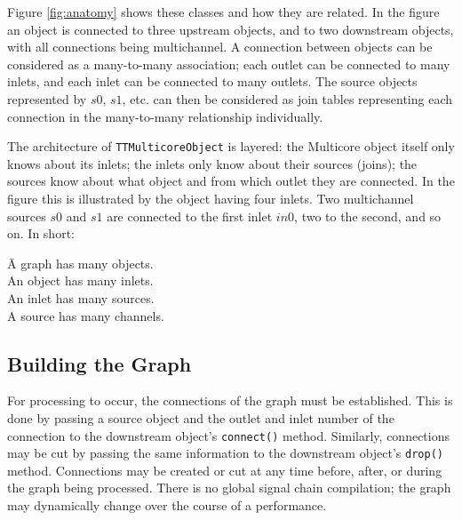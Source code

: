\documentclass[twoside,a4paper]{article}
\begin{document}
Figure \ref{fig:anatomy} shows these classes and how they are related. 
In the figure an object is connected to three upstream objects, and to two downstream objects, with all connections being multichannel. 
A connection between objects can be considered as a many-to-many association; each outlet can be connected to many inlets, and each inlet can be connected to many outlets. 
The source objects represented by $s0$, $s1$, etc. can then be considered as join tables representing each connection in the many-to-many relationship individually.

The architecture of \texttt{TTMulticoreObject} is layered: the Multicore object itself only knows about its inlets; the inlets only know about their sources (joins); the sources know about what object and from which outlet they are connected. 
In the figure this is illustrated by the object having four inlets. 
Two multichannel sources $s0$ and $s1$ are connected to the first inlet $in0$, two to the second, and so on. 
In short:
\begin{tabbing}
\hspace{2.6cm}\=A graph has many objects.\\
	\>An object has many inlets.\\
	\>An inlet has many sources.\\
	\>A source has many channels.
\end{tabbing}



\subsection{Building the Graph} %

For processing to occur, the connections of the graph must be established.  
This is done by passing a source object and the outlet and inlet number of the connection to the downstream object's \texttt{connect()} method.  
Similarly, connections may be cut by passing the same information to the downstream object's \texttt{drop()} method.  
Connections may be created or cut at any time before, after, or during the graph being processed.  
There is no global signal chain compilation; the graph may dynamically change over the course of a performance.
\end{document}
